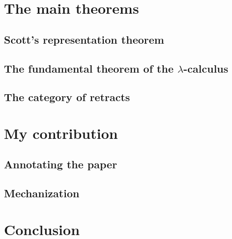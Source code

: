 \documentclass{amsart}
\begin{document}
  \section{The main theorems}

  \subsection{Scott's representation theorem}

  \subsection{The fundamental theorem of the $\lambda$-calculus}

  \subsection{The category of retracts}

  \section{My contribution}

  \subsection{Annotating the paper}

  \subsection{Mechanization}

  \section{Conclusion}
\end{document}
